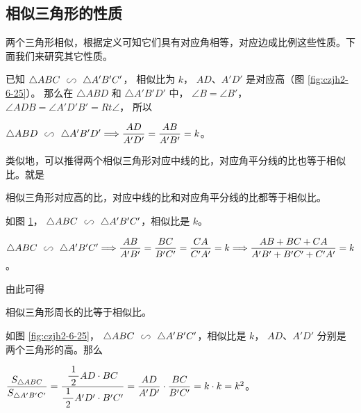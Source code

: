 \subsection{相似三角形的性质}\label{subsec:czjh2-6-8}
\begin{enhancedline}

两个三角形相似，根据定义可知它们具有对应角相等，对应边成比例这些性质。下面我们来研究其它性质。

已知 $\triangle ABC \xiangsi \triangle A'B'C'$， 相似比为 $k$， $AD$、$A'D'$ 是对应高（图 \ref{fig:czjh2-6-25}）。
那么在 $\triangle ABD$ 和 $\triangle A'B'D'$ 中， $\angle B = \angle B'$，
$\angle ADB = \angle A'D'B' = Rt \angle$， 所以

$\triangle ABD \xiangsi \triangle A'B'D'  \tuichu  \dfrac{AD}{A'D'} = \dfrac{AB}{A'B'} = k$。

\begin{figure}[htbp]
    \centering
    \begin{minipage}[b]{7cm}
        \centering
        
        \caption{}\label{fig:czjh2-6-25}
    \end{minipage}
    \qquad
    \begin{minipage}[b]{7cm}
        \centering
        
        \caption{}\label{fig:czjh2-6-26}
    \end{minipage}
\end{figure}

类似地，可以推得两个相似三角形对应中线的比，对应角平分线的比也等于相似比。就是

\begin{dingli}
    相似三角形对应高的比，对应中线的比和对应角平分线的比都等于相似比。
\end{dingli}

如图 \ref{fig:czjh2-6-26}， $\triangle ABC \xiangsi \triangle A'B'C'$，相似比是 $k$。

$\triangle ABC \xiangsi \triangle A'B'C'  \tuichu  \dfrac{AB}{A'B'} = \dfrac{BC}{B'C'} = \dfrac{CA}{C'A'} = k  \tuichu \dfrac{AB + BC + CA}{A'B' + B'C' + C'A'} = k$。

由此可得

\begin{dingli}
    相似三角形周长的比等于相似比。
\end{dingli}

如图 \ref{fig:czjh2-6-25}， $\triangle ABC \xiangsi \triangle A'B'C'$，相似比是 $k$，
$AD$、$A'D'$ 分别是两个三角形的高。那么

$\dfrac{S_{\triangle ABC}}{S_{\triangle A'B'C'}} = \dfrac{\dfrac{\; 1 \;}{2} AD \cdot BC}{\dfrac{\; 1 \;}{2} A'D' \cdot B'C'} = \dfrac{AD}{A'D'} \cdot \dfrac{BC}{B'C'} = k \cdot k = k^2$。


\end{enhancedline}
